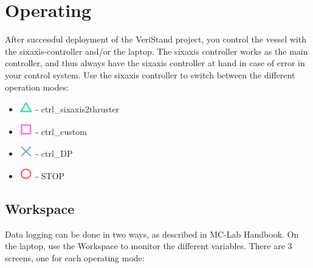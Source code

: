 \chapter{Operating}
After successful deployment of the VeriStand project, you control the vessel with the sixaxis-controller and/or the laptop. The sixaxis controller works as the main controller, and thus always have the sixaxis controller at hand in case of error in your control system. Use the sixaxis controller to switch between the different operation modes: 
\begin{itemize}
	\item \includegraphics[scale=0.4]{fig/sixaxis_triangle} - ctrl\_sixaxis2thruster
	\item \includegraphics[scale=0.4]{fig/sixaxis_square} - ctrl\_custom
	\item \includegraphics[scale=0.4]{fig/sixaxis_cross} - ctrl\_DP
	\item \includegraphics[scale=0.4]{fig/sixaxis_circle} - STOP
\end{itemize}
\section{Workspace}
Data logging can be done in two ways, as described in MC-Lab Handbook. On the laptop, use the Workspace to monitor the different variables. There are 3 screens, one for each operating mode: 
